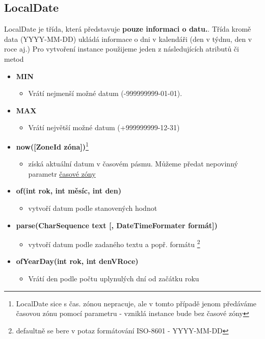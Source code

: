 \documentclass[11pt,a4paper,titlepage]{article}
\begin{document}
\subsection{LocalDate}
LocalDate je třída, která představuje \textbf{pouze informaci o datu.}. Třída kromě data (YYYY-MM-DD) ukládá informace o dni v kalendáři (den v týdnu, den v roce aj.) Pro vytvoření instance použijeme jeden z následujících atributů či metod
\begin{itemize}
    \item \textbf{MIN}
    \begin{itemize}
        \item Vrátí nejmenší možné datum (-999999999-01-01).
    \end{itemize}
    \item \textbf{MAX}
    \begin{itemize}
        \item Vrátí největší možné datum (+999999999-12-31)
    \end{itemize}
    \item \textbf{now([ZoneId zóna])}\footnote{LocalDate sice s čas. zónou nepracuje, ale v tomto případě jenom předáváme časovou zónu pomocí parametru - vzniklá instance bude bez časové zóny}
    \begin{itemize}
        \item získá aktuální datum v časovém pásmu. Můžeme předat nepovinný parametr \href{https://en.wikipedia.org/wiki/List_of_tz_database_time_zones}{časové zóny} 
    \end{itemize}
    \item \textbf{of(int rok, int měsíc, int den)}
    \begin{itemize}
        \item vytvoří datum podle stanovených hodnot
    \end{itemize}
    \item \textbf{parse(CharSequence text [, DateTimeFormater formát])}
    \begin{itemize}
        \item vytvoří datum podle zadaného textu a popř. formátu \footnote{defaultně se bere v potaz formátování ISO-8601 - YYYY-MM-DD}
    \end{itemize}
    \item \textbf{ofYearDay(int rok, int denVRoce)}
    \begin{itemize}
        \item Vrátí den podle počtu uplynulých dní od začátku roku
    \end{itemize}
\end{itemize}
\end{document}
